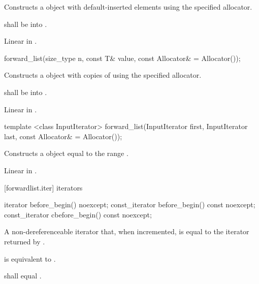 \begin{itemdescr}
\pnum
\effects Constructs a  object with 
default-inserted elements using the specified allocator.

\pnum
\requires {} shall be  into .

\pnum
\complexity Linear in .
\end{itemdescr}

%
\begin{itemdecl}
forward_list(size_type n, const T& value, const Allocator& = Allocator());
\end{itemdecl}

\begin{itemdescr}
\pnum
\effects Constructs a  object with  copies of  using the specified allocator.

\pnum
\requires {} shall be  into .

\pnum
\complexity Linear in .
\end{itemdescr}

%
\begin{itemdecl}
template <class InputIterator>
  forward_list(InputIterator first, InputIterator last, const Allocator& = Allocator());
\end{itemdecl}

\begin{itemdescr}
\pnum
\effects Constructs a  object equal to the range .

\pnum
\complexity Linear in .
\end{itemdescr}

[forwardlist.iter]{ iterators}

%
%
%
%
\begin{itemdecl}
iterator before_begin() noexcept;
const_iterator before_begin() const noexcept;
const_iterator cbefore_begin() const noexcept;
\end{itemdecl}

\begin{itemdescr}
\pnum
\returns A non-dereferenceable iterator that, when incremented, is equal to the iterator
returned by .

\pnum
\effects {} is equivalent to
.

\pnum
\remarks {} shall equal .
\end{itemdescr}

